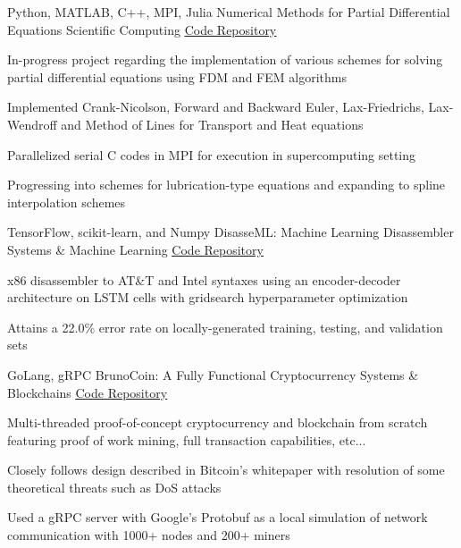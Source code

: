 
\begin{cventries}
    \cventry
    {Python, MATLAB, C++, MPI, Julia} %
    {Numerical Methods for Partial Differential Equations} %
    {Scientific  Computing} %
    {\underline{\href{https://github.com/alizma/PDEs_and_Numerics}{Code Repository}}} %
    {
      \begin{cvitems} %
      	\item {In-progress project regarding the implementation of various schemes for solving partial differential equations using FDM and FEM algorithms}
      	\item {Implemented Crank-Nicolson, Forward and Backward Euler, Lax-Friedrichs, Lax-Wendroff and Method of Lines for Transport and Heat equations}
      	\item {Parallelized serial C codes in MPI for execution in supercomputing setting}
      	\item {Progressing into schemes for lubrication-type equations and expanding to spline interpolation schemes}
      \end{cvitems}
    }
    
 \cventry
   {TensorFlow, scikit-learn, and Numpy} %
   {DisasseML: Machine Learning Disassembler} %
   {Systems \& Machine Learning} %
   {\underline{\href{https://github.com/alizma/disasseML}{Code Repository}}} %
   {
     \begin{cvitems} %
       \item {x86 disassembler to AT\&T and Intel syntaxes using an encoder-decoder architecture on LSTM cells with gridsearch hyperparameter optimization}
       \item {Attains a 22.0\% error rate on locally-generated training, testing, and validation sets}
     \end{cvitems}
   }
   
   \cventry
   {GoLang, gRPC} %
   {BrunoCoin: A Fully Functional Cryptocurrency} %
   {Systems \& Blockchains} %
   {\href{https://github.com/alizma/BrunoCoin}{\underline{Code Repository}}} %
   {
     \begin{cvitems} %
     	\item {Multi-threaded proof-of-concept cryptocurrency and blockchain from scratch featuring proof of work mining, full transaction capabilities, etc...}
		\item {Closely follows design described in Bitcoin's whitepaper with resolution of some theoretical threats such as DoS attacks }
		\item {Used a gRPC server with Google's Protobuf as a local simulation of network communication with 1000+ nodes and 200+ miners}
      \end{cvitems}
   }
    

\end{cventries}

